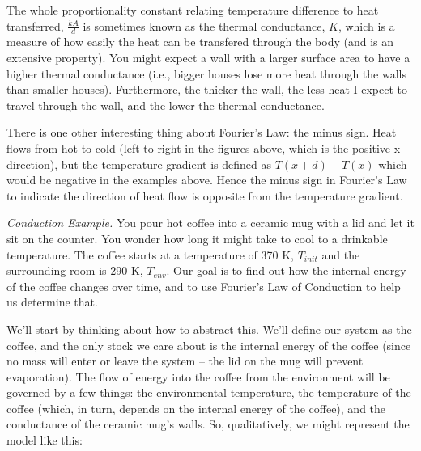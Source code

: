 The whole proportionality constant relating temperature difference to heat transferred, $\frac{kA}{d}$ is sometimes known as the thermal conductance, $K$, which is a measure of how easily the heat can be transfered through the body (and is an extensive property). You might expect a wall with a larger surface area to have a higher thermal conductance (i.e., bigger houses lose more heat through the walls than smaller houses).  Furthermore, the thicker the wall, the less heat I expect to travel through the wall, and the lower the thermal conductance.

There is one other interesting thing about Fourier's Law: the minus sign. Heat flows from hot to cold (left to right in the figures above, which is the positive x direction), but the temperature gradient is defined as $T(x+d) - T(x) $ which would be negative in the examples above. Hence the minus sign in Fourier's Law to indicate the direction of heat flow is opposite from the temperature gradient.

{\it Conduction Example.}  You pour hot coffee into a ceramic mug with a lid and let it sit on the counter.  You wonder how long it might take to cool to a drinkable temperature. The coffee starts at a temperature of 370 K, $T_{init}$  and the surrounding room is 290 K, $T_{env}$. Our goal is to find out how the internal energy of the coffee changes over time, and to use Fourier's Law of Conduction to help us determine that.

We'll start by thinking about how to abstract this.  We'll define our system as the coffee, and the only stock we care about is the internal energy of the coffee (since no mass will enter or leave the system -- the lid on the mug will prevent evaporation).  The flow of energy into the coffee from the environment will be governed by a few things:  the environmental temperature, the temperature of the coffee (which, in turn, depends on the internal energy of the coffee), and the conductance of the ceramic mug's walls.  So, qualitatively, we might represent the model like this:

